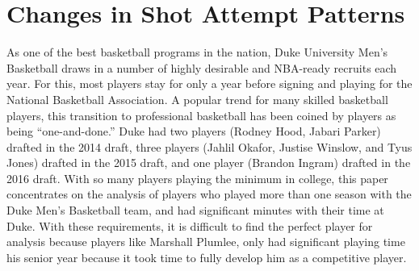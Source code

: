 \documentclass[12pt,twoside]{dukestatscithesis}
\theoremstyle{definition}
\theoremstyle{definition}
\theoremstyle{definition}
\theoremstyle{remark}
\begin{document}
\section{Changes in Shot Attempt
Patterns}\label{changes-in-shot-attempt-patterns}

As one of the best basketball programs in the nation, Duke University
Men's Basketball draws in a number of highly desirable and NBA-ready
recruits each year. For this, most players stay for only a year before
signing and playing for the National Basketball Association. A popular
trend for many skilled basketball players, this transition to
professional basketball has been coined by players as being
``one-and-done.'' Duke had two players (Rodney Hood, Jabari Parker)
drafted in the 2014 draft, three players (Jahlil Okafor, Justise
Winslow, and Tyus Jones) drafted in the 2015 draft, and one player
(Brandon Ingram) drafted in the 2016 draft. With so many players playing
the minimum in college, this paper concentrates on the analysis of
players who played more than one season with the Duke Men's Basketball
team, and had significant minutes with their time at Duke. With these
requirements, it is difficult to find the perfect player for analysis
because players like Marshall Plumlee, only had significant playing time
his senior year because it took time to fully develop him as a
competitive player.
\end{document}
